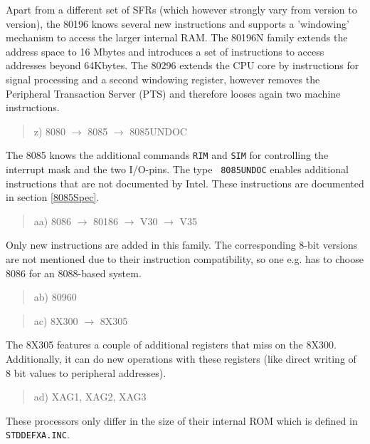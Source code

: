 \documentclass[12pt,twoside]{report}
\newcommand{\tty}[1]{{\tt #1}}
\begin{document}
Apart from a different set of SFRs (which however strongly vary from
version to version), the 80196 knows several new instructions and
supports a 'windowing' mechanism to access the larger internal RAM.
The 80196N family extends the address space to 16 Mbytes and
introduces a set of instructions to access addresses beyond 64Kbytes.
The 80296 extends the CPU core by instructions for signal processing
and a second windowing register, however removes the Peripheral
Transaction Server (PTS) and therefore looses again two machine
instructions.
\begin{quote}
z) 8080 $\rightarrow$ 8085 $\rightarrow$ 8085UNDOC
\end{quote}
The 8085 knows the additional commands \tty{RIM} and \tty{SIM} for
controlling the interrupt mask and the two I/O-pins.  The type {\tt
8085UNDOC} enables additional instructions that are not documented
by Intel.  These instructions are documented in section \ref{8085Spec}.
\begin{quote}
aa) 8086 $\rightarrow$ 80186 $\rightarrow$ V30 $\rightarrow$ V35
\end{quote}
Only new instructions are added in this family.  The corresponding
8-bit versions are not mentioned due to their instruction
compatibility, so one e.g. has to choose 8086 for an 8088-based
system.
\begin{quote}
ab) 80960
\end{quote}
\begin{quote}
ac) 8X300 $\rightarrow$ 8X305
\end{quote}
The 8X305 features a couple of additional registers that miss on the
8X300.  Additionally, it can do new operations with these registers
(like direct writing of 8 bit values to peripheral addresses).
\begin{quote}
ad) XAG1, XAG2, XAG3
\end{quote}
These processors only differ in the size of their internal ROM which
is defined in \tty{STDDEFXA.INC}.
\end{document}
